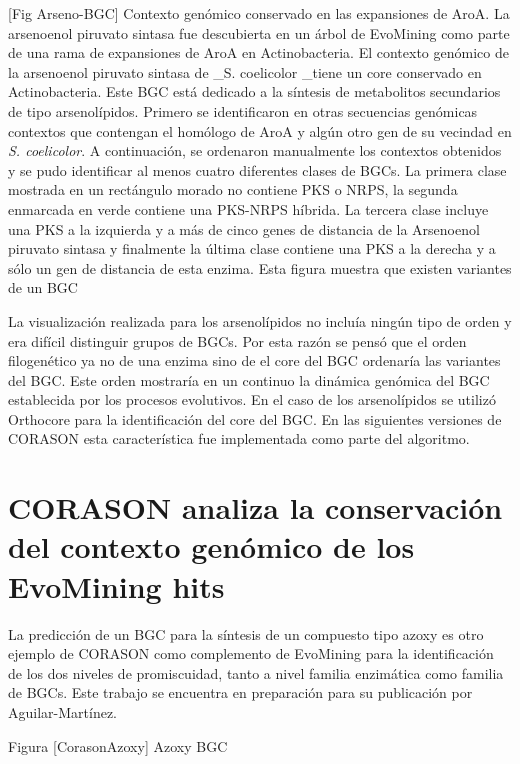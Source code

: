 \documentclass[12pt,twoside]{reedthesis}
\begin{document}
  {[}Fig Arseno-BGC{]} Contexto genómico conservado en las expansiones de
  AroA. La arsenoenol piruvato sintasa fue descubierta en un árbol de
  EvoMining como parte de una rama de expansiones de AroA en
  Actinobacteria. El contexto genómico de la arsenoenol piruvato sintasa
  de \_S. coelicolor \_tiene un core conservado en Actinobacteria. Este
  BGC está dedicado a la síntesis de metabolitos secundarios de tipo
  arsenolípidos. Primero se identificaron en otras secuencias genómicas
  contextos que contengan el homólogo de AroA y algún otro gen de su
  vecindad en \emph{S. coelicolor}. A continuación, se ordenaron
  manualmente los contextos obtenidos y se pudo identificar al menos
  cuatro diferentes clases de BGCs. La primera clase mostrada en un
  rectángulo morado no contiene PKS o NRPS, la segunda enmarcada en verde
  contiene una PKS-NRPS híbrida. La tercera clase incluye una PKS a la
  izquierda y a más de cinco genes de distancia de la Arsenoenol piruvato
  sintasa y finalmente la última clase contiene una PKS a la derecha y a
  sólo un gen de distancia de esta enzima. Esta figura muestra que existen
  variantes de un BGC
  
  La visualización realizada para los arsenolípidos no incluía ningún tipo
  de orden y era difícil distinguir grupos de BGCs. Por esta razón se
  pensó que el orden filogenético ya no de una enzima sino de el core del
  BGC ordenaría las variantes del BGC. Este orden mostraría en un continuo
  la dinámica genómica del BGC establecida por los procesos evolutivos. En
  el caso de los arsenolípidos se utilizó Orthocore para la identificación
  del core del BGC. En las siguientes versiones de CORASON esta
  característica fue implementada como parte del algoritmo.
  
  \section{CORASON analiza la conservación del contexto genómico de los
  EvoMining
  hits}\label{corason-analiza-la-conservacion-del-contexto-genomico-de-los-evomining-hits}
  
  La predicción de un BGC para la síntesis de un compuesto tipo azoxy es
  otro ejemplo de CORASON como complemento de EvoMining para la
  identificación de los dos niveles de promiscuidad, tanto a nivel familia
  enzimática como familia de BGCs. Este trabajo se encuentra en
  preparación para su publicación por Aguilar-Martínez.
  
  Figura {[}CorasonAzoxy{]} Azoxy BGC
  
\end{document}
